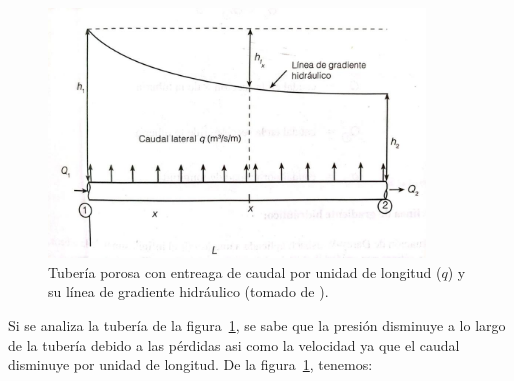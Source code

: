 \documentclass[10pt, oneside]{article}
\begin{document}
\begin{figure}[h]
\centering
\includegraphics[width=10cm]{./figs/porot.jpeg}
\caption{Tuber\'ia porosa con entreaga de caudal por unidad de longitud ($q$) y su l\'inea de gradiente hidr\'aulico (tomado de \cite{saldarriaga}).} 
\label{porot}
\end{figure}
Si se analiza la tuber\'ia de la figura~\ref{porot}, se sabe que la presi\'on disminuye a lo largo de la tuber\'ia debido a las p\'erdidas asi como la velocidad ya que el caudal disminuye por unidad de longitud. De la figura~\ref{porot}, tenemos:
\end{document}
